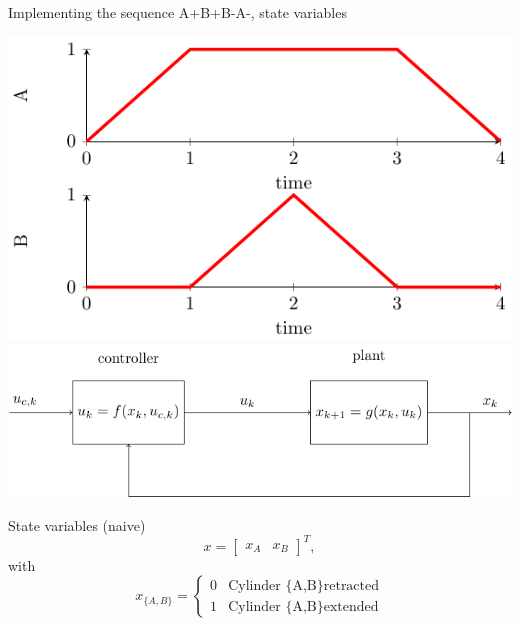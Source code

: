 \documentclass[presentation,aspectratio=1610]{beamer}
\begin{document}
\begin{frame}[label={sec:org15b87dc}]{Implementing the sequence A+B+B-A-, state variables}
\begin{center}
\includegraphics[width=0.3\linewidth]{../figures/AplusBplusBminAmin}
\includegraphics[width=0.68\linewidth]{../figures/logic-control-loop}
\end{center}

\begin{block}{State variables (naive)}
\[ x = \begin{bmatrix} x_A & x_B \end{bmatrix}^T, \]
with
\[ x_{\{A,B\}} = \begin{cases} 0 & \text{Cylinder \{A,B\} retracted}\\
                               1& \text{Cylinder \{A,B\} extended}
                 \end{cases}
   \]
\end{block}
\end{frame}
\end{document}
